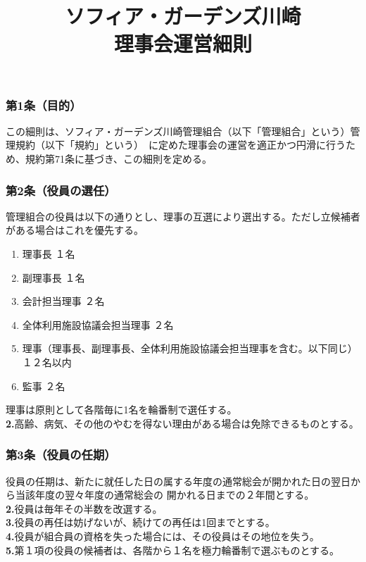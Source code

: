 \documentclass[12pt,uplatex]{jsarticle}
\title{ソフィア・ガーデンズ川崎 \\  理事会運営細則}
\begin{document}
\maketitle
\tableofcontents
\clearpage
\addtocounter{page}{-1}
\pagestyle{plain}

\subsubsection*{ 第1条（目的）}
この細則は、ソフィア・ガーデンズ川崎管理組合（以下「管理組合」という）管理規約（以下「規約」という）\
に定めた理事会の運営を適正かつ円滑に行うため、規約第71条に基づき、この細則を定める。

\subsubsection*{ 第2条（役員の選任）}
管理組合の役員は以下の通りとし、理事の互選により選出する。ただし立候補者がある場合はこれを優先する。
\begin{enumerate}
\item 理事長				１名
\item 副理事長				１名
\item 会計担当理事				２名
\item 全体利用施設協議会担当理事		２名
\item 理事（理事長、副理事長、全体利用施設協議会担当理事を含む。以下同じ） １２名以内
\item 監事				２名
\end{enumerate}
理事は原則として各階毎に1名を輪番制で選任する。\\
\textbf{2.}高齢、病気、その他のやむを得ない理由がある場合は免除できるものとする。\\

\subsubsection*{ 第3条（役員の任期）}
役員の任期は、新たに就任した日の属する年度の通常総会が開かれた日の翌日から当該年度の翌々年度の通常総会の
開かれる日までの２年間とする。\\
\textbf{2.}役員は毎年その半数を改選する。\\
\textbf{3.}役員の再任は妨げないが、続けての再任は1回までとする。\\
\textbf{4.}役員が組合員の資格を失った場合には、その役員はその地位を失う。\\
\textbf{5.}第１項の役員の候補者は、各階から１名を極力輪番制で選ぶものとする。\\
\end{document}

